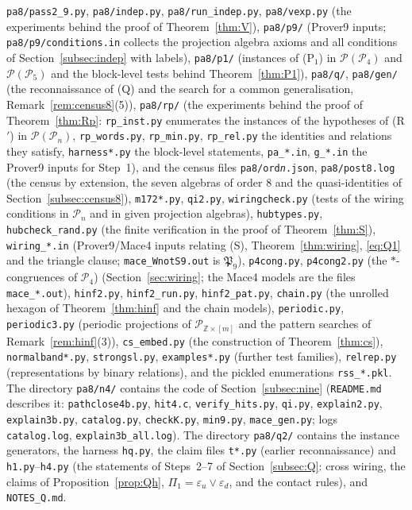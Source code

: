 \documentclass[11pt]{amsart}
\theoremstyle{definition}
\renewcommand{\P}{\mathcal{P}}
\newcommand{\Z}{\mathbb{Z}}
\begin{document}
\texttt{pa8/pass2\_9.py}, \texttt{pa8/indep.py}, \texttt{pa8/run\_indep.py}, \texttt{pa8/vexp.py} (the experiments behind the proof of Theorem~\ref{thm:V}), \texttt{pa8/p9/} (Prover9 inputs; \texttt{pa8/p9/conditions.in} collects the projection algebra axioms and all conditions of Section~\ref{subsec:indep} with labels), \texttt{pa8/p1/} (instances of (P$_1$) in $\P(\P_4)$ and $\P(\P_5)$ and the block-level tests behind Theorem~\ref{thm:P1}), \texttt{pa8/q/}, \texttt{pa8/gen/} (the reconnaissance of (Q) and the search for a common generalisation, Remark~\ref{rem:census8}(5)), \texttt{pa8/rp/} (the experiments behind the proof of Theorem~\ref{thm:Rp}: \texttt{rp\_inst.py} enumerates the instances of the hypotheses of (R$'$) in $\P(\P_n)$, \texttt{rp\_words.py}, \texttt{rp\_min.py}, \texttt{rp\_rel.py} the identities and relations they satisfy, \texttt{harness*.py} the block-level statements, \texttt{pa\_*.in}, \texttt{g\_*.in} the Prover9 inputs for Step~1), and the census files \texttt{pa8/ord\emph{n}.json}, \texttt{pa8/post8.log} (the census by extension, the seven algebras of order $8$ and the quasi-identities of Section~\ref{subsec:census8}), \texttt{m172*.py}, \texttt{qi2.py}, \texttt{wiringcheck.py} (tests of the wiring conditions in $\P_n$ and in given projection algebras), \texttt{hubtypes.py}, \texttt{hubcheck\_rand.py} (the finite verification in the proof of Theorem~\ref{thm:S}), \texttt{wiring\_*.in} (Prover9/Mace4 inputs relating (S), Theorem~\ref{thm:wiring}, \eqref{eq:Q1} and the triangle clause; \texttt{mace\_WnotS9.out} is $\mathfrak P_9$), \texttt{p4cong.py}, \texttt{p4cong2.py} (the $*$-congruences of $\P_4$) (Section~\ref{sec:wiring}; the Mace4 models are the files \texttt{mace\_*.out}), \texttt{hinf2.py}, \texttt{hinf2\_run.py}, \texttt{hinf2\_pat.py}, \texttt{chain.py} (the unrolled hexagon of Theorem~\ref{thm:hinf} and the chain models), \texttt{periodic.py}, \texttt{periodic3.py} (periodic projections of $\P_{\Z\times[m]}$ and the pattern searches of Remark~\ref{rem:hinf}(3)), \texttt{cs\_embed.py} (the construction of Theorem~\ref{thm:cs}), \texttt{normalband*.py}, \texttt{strongsl.py}, \texttt{examples*.py} (further test families), \texttt{relrep.py} (representations by binary relations), and the pickled enumerations \texttt{rss\_*.pkl}. The directory \texttt{pa8/n4/} contains the code of Section~\ref{subsec:nine} (\texttt{README.md} describes it: \texttt{pathclose4b.py}, \texttt{hit4.c}, \texttt{verify\_hits.py}, \texttt{qi.py}, \texttt{explain2.py}, \texttt{explain3b.py}, \texttt{catalog.py}, \texttt{checkK.py}, \texttt{min9.py}, \texttt{mace\_gen.py}; logs \texttt{catalog.log}, \texttt{explain3b\_all.log}). The directory \texttt{pa8/q2/} contains the instance generators, the harness \texttt{hq.py}, the claim files \texttt{t*.py} (earlier reconnaissance) and \texttt{h1.py}--\texttt{h4.py} (the statements of Steps~2--7 of Section~\ref{subsec:Q}: cross wiring, the claims of Proposition~\ref{prop:Qh}, $\Pi_1=\varepsilon_u\vee\varepsilon_d$, and the contact rules), and \texttt{NOTES\_Q.md}.
\end{document}
